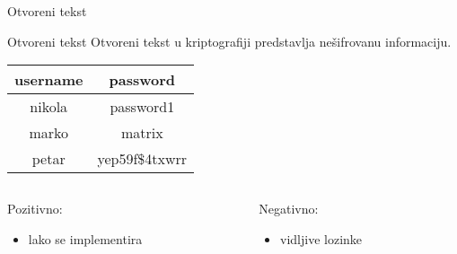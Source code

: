 \documentclass[aspectratio=169,xcolor=dvipsnames]{beamer}
\begin{document}
\begin{frame}{Otvoreni tekst}

    \begin{block}{Otvoreni tekst}
        Otvoreni tekst u kriptografiji predstavlja nešifrovanu informaciju.
    \end{block}

    \vspace{1em}

    \begin{center}
        \begin{tabular}{c|c}
            username & password \\
            \hline
            nikola & password1 \\
            marko & matrix \\
            petar & yep59f\$4txwrr
        \end{tabular}
    \end{center}

    \vspace{1em}

    \begin{columns}
        \begin{column}{0.4\textwidth}
            \pause
            Pozitivno:
            \pause
            \begin{itemize}
                \item lako se implementira
            \end{itemize}
        \end{column}
        \begin{column}{0.4\textwidth}
            \pause
            Negativno:
            \pause
            \begin{itemize}
                \item vidljive lozinke
            \end{itemize}
        \end{column}
    \end{columns}

\end{frame}

\end{document}
